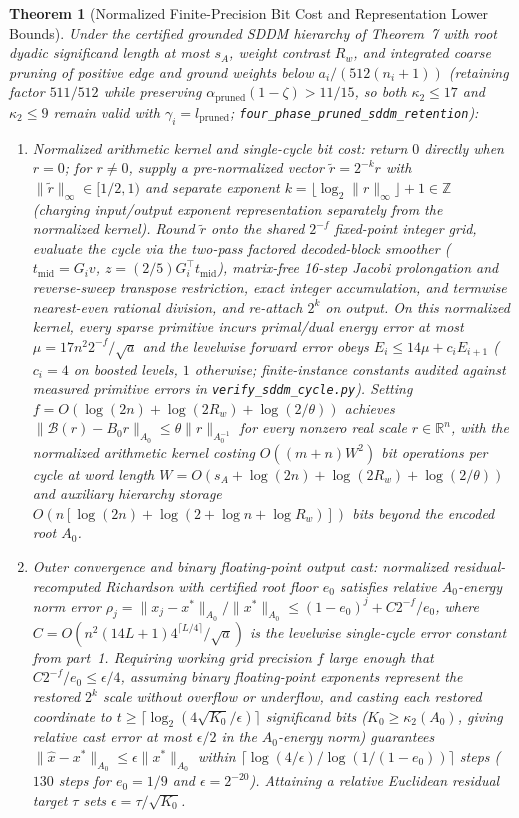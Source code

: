 \documentclass[10pt]{article}
\newtheorem{theorem}{Theorem}
\begin{document}
\begin{theorem}[Normalized Finite-Precision Bit Cost and Representation Lower Bounds]
Under the certified grounded SDDM hierarchy of Theorem~7 with root dyadic significand length at most $s_A$, weight contrast $R_w$, and integrated coarse pruning of positive edge and ground weights below $a_i/(512(n_i+1))$ (retaining factor $511/512$ while preserving $\alpha_{\mathrm{pruned}}(1-\zeta) > 11/15$, so both $\kappa_2 \le 17$ and $\kappa_2 \le 9$ remain valid with $\gamma_i = l_{\mathrm{pruned}}$; \texttt{four\_phase\_pruned\_sddm\_retention}):
\begin{enumerate}
  \item \emph{Normalized arithmetic kernel and single-cycle bit cost:} return $0$ directly when $r = 0$; for $r \neq 0$, supply a pre-normalized vector $\tilde{r} = 2^{-k}r$ with $\|\tilde{r}\|_\infty \in [1/2,1)$ and separate exponent $k = \lfloor\log_2\|r\|_\infty\rfloor + 1 \in \mathbb{Z}$ (charging input/output exponent representation separately from the normalized kernel). Round $\tilde{r}$ onto the shared $2^{-f}$ fixed-point integer grid, evaluate the cycle via the two-pass factored decoded-block smoother ($t_{\mathrm{mid}} = G_i v$, $z = (2/5)G_i^\top t_{\mathrm{mid}}$), matrix-free 16-step Jacobi prolongation and reverse-sweep transpose restriction, exact integer accumulation, and termwise nearest-even rational division, and re-attach $2^k$ on output. On this normalized kernel, every sparse primitive incurs primal/dual energy error at most $\mu = 17 n^2 2^{-f}/\sqrt{a}$ and the levelwise forward error obeys $E_i \le 14\mu + c_i E_{i+1}$ ($c_i = 4$ on boosted levels, $1$ otherwise; finite-instance constants audited against measured primitive errors in \texttt{verify\_sddm\_cycle.py}). Setting $f = O(\log(2n) + \log(2R_w) + \log(2/\theta))$ achieves $\|\mathcal{B}(r) - B_0 r\|_{A_0} \le \theta\|r\|_{A_0^{-1}}$ for every nonzero real scale $r \in \mathbb{R}^n$, with the normalized arithmetic kernel costing $O((m+n)W^2)$ bit operations per cycle at word length $W = O(s_A + \log(2n) + \log(2R_w) + \log(2/\theta))$ and auxiliary hierarchy storage $O(n[\log(2n) + \log(2 + \log n + \log R_w)])$ bits beyond the encoded root $A_0$.
  \item \emph{Outer convergence and binary floating-point output cast:} normalized residual-recomputed Richardson with certified root floor $e_0$ satisfies relative $A_0$-energy norm error $\rho_j = \|x_j - x^*\|_{A_0}/\|x^*\|_{A_0} \le (1-e_0)^j + C 2^{-f}/e_0$, where $C = O(n^2(14L+1)4^{\lceil L/4\rceil}/\sqrt{a})$ is the levelwise single-cycle error constant from part~1. Requiring working grid precision $f$ large enough that $C 2^{-f}/e_0 \le \epsilon/4$, assuming binary floating-point exponents represent the restored $2^k$ scale without overflow or underflow, and casting each restored coordinate to $t \ge \lceil\log_2(4\sqrt{K_0}/\epsilon)\rceil$ significand bits ($K_0 \ge \kappa_2(A_0)$, giving relative cast error at most $\epsilon/2$ in the $A_0$-energy norm) guarantees $\|\hat{x} - x^*\|_{A_0} \le \epsilon\|x^*\|_{A_0}$ within $\lceil\log(4/\epsilon)/\log(1/(1-e_0))\rceil$ steps ($130$ steps for $e_0 = 1/9$ and $\epsilon = 2^{-20}$). Attaining a relative Euclidean residual target $\tau$ sets $\epsilon = \tau/\sqrt{K_0}$.

\end{enumerate}
\end{theorem}
\end{document}
